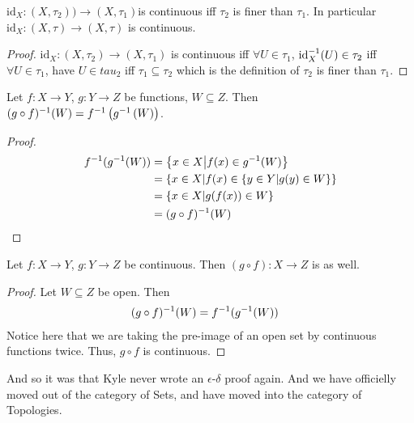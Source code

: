 \documentclass[12pt, twosided]{article}
\begin{document}
\begin{prop}
  \(\mathrm{id}_X: (X, \tau_2)) \to (X, \tau_1)\)is continuous iff \(\tau_2\) is finer than \(\tau_1\).
  In particular \(\mathrm{id}_X: (X, \tau) \to (X, \tau)\) is continuous.
\end{prop}
\begin{proof}
  \(\mathrm{id}_X:(X, \tau_2) \to (X, \tau_1)\) is continuous iff \(\forall U \in \tau_1\), \(\mathrm{id}^{-1}_X(U) \in \tau_2\) iff \(\forall U \in \tau_1\), have \(U \in tau_2\) iff \(\tau_1 \subseteq \tau_2\) which is the definition of \(\tau_2\) is finer than \(\tau_1\).
\end{proof}

\begin{lm}
  Let \(f: X \to Y\), \(g: Y \to Z\) be functions, \(W \subseteq Z\). Then \((g \circ f)^{-1}(W) = f^{-1}\left(g^{-1}\left(W\right)\right)\).
\end{lm}
\begin{proof}
  \begin{align*}
    f^{-1}(g^{-1}(W)) &= \left\{ x \in X \middle\vert f(x) \in g^{-1}(W) \right\} \\
                &= \left\{ x \in X \middle\vert f(x) \in \left\{ y \in Y \middle \vert g(y) \in W \right\} \right\} \\
                &= \left\{ x \in X \middle\vert g(f(x)) \in W \right\} \\
                &= (g \circ f)^{-1} (W)
  \end{align*}
\end{proof}

\begin{prop}
  Let \(f: X \to Y\), \(g: Y \to Z\) be continuous. Then \((g \circ f): X \to Z\) is as well.
\end{prop}
\begin{proof}
  Let \(W \subseteq Z\) be open. Then
  \begin{align*}
    (g \circ f)^{-1}(W) &= f^{-1}(g^{-1}(W))
  \end{align*}
  Notice here that we are taking the pre-image of an open set by continuous functions twice. Thus, \(g \circ f\) is continuous.
\end{proof}
And so it was that Kyle never wrote an \(\epsilon\)-\(\delta\) proof again. And we have officielly moved out of the category of Sets, and have moved into the category of Topologies.
\end{document}
